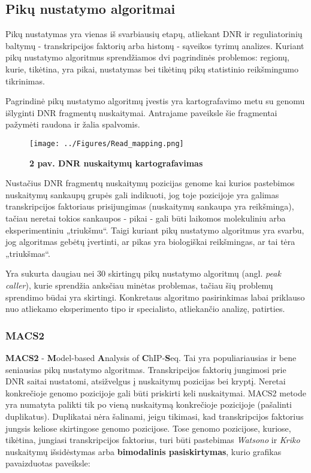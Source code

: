 \documentclass[12pt]{article}
\begin{document}
\newpage

\subsection{Pikų nustatymo algoritmai}
Pikų nustatymas yra vienas iš svarbiausių etapų, atliekant DNR ir reguliatorinių
baltymų - transkripcijos faktorių arba histonų - sąveikos tyrimų analizes.
Kuriant pikų nustatymo algoritmus sprendžiamos dvi pagrindinės problemos:
regionų, kurie, tikėtina, yra pikai, nustatymas bei tikėtinų pikų statistinio
reikšmingumo tikrinimas.

Pagrindinė pikų nustatymo algoritmų įvestis yra kartografavimo metu su genomu
išlyginti DNR fragmentų nuskaitymai. Antrajame paveiksle šie fragmentai pažymėti
raudona ir žalia spalvomis.

\begin{figure}[ht]
    \begin{center}
        \texttt{[image: ../Figures/Read\_mapping.png]}
        \vspace{-1\baselineskip}
        \caption*{\small\textbf{2 pav. DNR nuskaitymų kartografavimas}}
    \end{center}
\end{figure}

Nustačius DNR fragmentų nuskaitymų pozicijas genome kai kurios pastebimos
nuskaitymų sankaupų grupės gali indikuoti, jog toje pozicijoje yra galimas
transkripcijos faktoriaus prisijungimas (nuskaitymų sankaupa yra reikšminga),
tačiau neretai tokios sankaupos - pikai - gali būti laikomos molekuliniu arba
eksperimentiniu „triukšmu“. Taigi kuriant pikų nustatymo algoritmus yra
svarbu, jog algoritmas gebėtų įvertinti, ar pikas yra biologiškai reikšmingas,
ar tai tėra „triukšmas“.

Yra sukurta daugiau nei 30 skirtingų pikų nustatymo algoritmų (angl.
\emph{peak caller}), kurie sprendžia anksčiau minėtas problemas,
tačiau šių problemų sprendimo būdai yra skirtingi. Konkretaus algoritmo
pasirinkimas labai priklauso nuo atliekamo eksperimento tipo ir specialisto,
atliekančio analizę, patirties\cite{ARTICLE13}.

\subsubsection{MACS2}
\textbf{MACS2} - \textbf{M}odel-based \textbf{A}nalysis of
\textbf{C}hIP-\textbf{S}eq. Tai yra populiariausias ir bene seniausias
pikų nustatymo algoritmas.
Transkripcijos faktorių jungimosi prie DNR saitai nustatomi, atsižvelgus į
nuskaitymų pozicijas bei kryptį. Neretai konkrečioje genomo pozicijoje gali
būti priskirti keli nuskaitymai. MACS2 metode yra numatyta palikti tik po
vieną nuskaitymą konkrečioje pozicijoje (pašalinti duplikatus). Duplikatai
nėra šalinami, jeigu tikimasi, kad transkripcijos faktorius jungsis keliose
skirtingose genomo pozicijose. Tose genomo pozicijose, kuriose, tikėtina,
jungiasi transkripcijos faktorius, turi būti pastebimas \emph{Watsono} ir
\emph{Kriko} nuskaitymų išsidėstymas arba \textbf{bimodalinis pasiskirtymas},
kurio grafikas pavaizduotas paveiksle:
\end{document}
